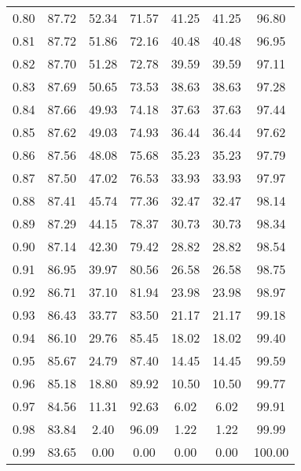 \begin{tabular}{|c|c|c|c|c|c|c|}
      0.80 &     87.72 &     52.34 &      71.57 &   41.25 &      41.25 &         96.80 \\
      0.81 &     87.72 &     51.86 &      72.16 &   40.48 &      40.48 &         96.95 \\
      0.82 &     87.70 &     51.28 &      72.78 &   39.59 &      39.59 &         97.11 \\
      0.83 &     87.69 &     50.65 &      73.53 &   38.63 &      38.63 &         97.28 \\
      0.84 &     87.66 &     49.93 &      74.18 &   37.63 &      37.63 &         97.44 \\
      0.85 &     87.62 &     49.03 &      74.93 &   36.44 &      36.44 &         97.62 \\
      0.86 &     87.56 &     48.08 &      75.68 &   35.23 &      35.23 &         97.79 \\
      0.87 &     87.50 &     47.02 &      76.53 &   33.93 &      33.93 &         97.97 \\
      0.88 &     87.41 &     45.74 &      77.36 &   32.47 &      32.47 &         98.14 \\
      0.89 &     87.29 &     44.15 &      78.37 &   30.73 &      30.73 &         98.34 \\
      0.90 &     87.14 &     42.30 &      79.42 &   28.82 &      28.82 &         98.54 \\
      0.91 &     86.95 &     39.97 &      80.56 &   26.58 &      26.58 &         98.75 \\
      0.92 &     86.71 &     37.10 &      81.94 &   23.98 &      23.98 &         98.97 \\
      0.93 &     86.43 &     33.77 &      83.50 &   21.17 &      21.17 &         99.18 \\
      0.94 &     86.10 &     29.76 &      85.45 &   18.02 &      18.02 &         99.40 \\
      0.95 &     85.67 &     24.79 &      87.40 &   14.45 &      14.45 &         99.59 \\
      0.96 &     85.18 &     18.80 &      89.92 &   10.50 &      10.50 &         99.77 \\
      0.97 &     84.56 &     11.31 &      92.63 &    6.02 &       6.02 &         99.91 \\
      0.98 &     83.84 &      2.40 &      96.09 &    1.22 &       1.22 &         99.99 \\
      0.99 &     83.65 &      0.00 &       0.00 &    0.00 &       0.00 &        100.00 \\
\bottomrule
\end{tabular}
